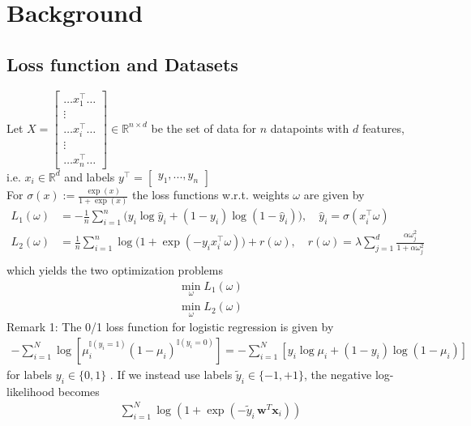 \documentclass{article}
\begin{document}
\section{Background}
\subsection{Loss function and Datasets}
Let 
$X = 
\begin{bmatrix}
\hdots x_1^\top \hdots \\
\vdots \\
\hdots x_i^\top \hdots\\
\vdots \\
\hdots x_n^\top \hdots
\end{bmatrix}
\in \mathbb{R}^{n \times d}$ \quad be the set of data for $n$ datapoints with $d$ features, i.e. $x_i \in \mathbb{R}^d$ and labels $y^\top = \begin{bmatrix} y_1,...,y_n\end{bmatrix}$\\
For $\sigma(x) := \frac{\exp(x)}{1+\exp(x)}$ the loss functions w.r.t. weights $\omega$ are given by
\begin{align}
L_1(\omega) &= -\frac{1}{n} \sum_{i=1}^{n} \Big( y_i \log \hat{y}_i + (1 - y_i) \log (1 - \hat{y}_i) \Big), \quad \hat{y}_i = \sigma(x_i^\top \omega) \\
L_2(\omega) &= \frac{1}{n} \sum_{i=1}^{n} \log\big(1 + \exp(-y_i x_i^\top \omega)\big) + r(\omega), \quad
r(\omega) = \lambda \sum_{j=1}^{d} \frac{\alpha \omega _j^2}{1 + \alpha \omega _j^2} \\
\end{align}
which yields the two optimization problems
\begin{align}
  \min _{\omega} L_1(\omega)\\
  \min _{\omega} L_2(\omega)
\end{align}
Remark 1: The 0/1 loss function for logistic regression is given by
\begin{align*}
  -\sum_{i=1}^N \log\left[ \mu_i^{\mathbb{I}(y_i=1)} (1-\mu_i)^{\mathbb{I}(y_i=0)} \right] 
  =  -\sum_{i=1}^N \left[ y_i \log \mu_i + (1 - y_i) \log(1-\mu_i) \right]
\end{align*}
for labels $y_i \in \{0,1\}$ \cite[Eq.~8.2--8.3]{murphy2012ml}.
If we instead use labels $\tilde{y}_i \in \{-1, +1\}$, the negative log-likelihood becomes
\begin{align*}
  \sum_{i=1}^N \log\left(1 + \exp(-\tilde{y}_i\,\mathbf{w}^T\mathbf{x}_i)\right)
\end{align*}
\end{document}
